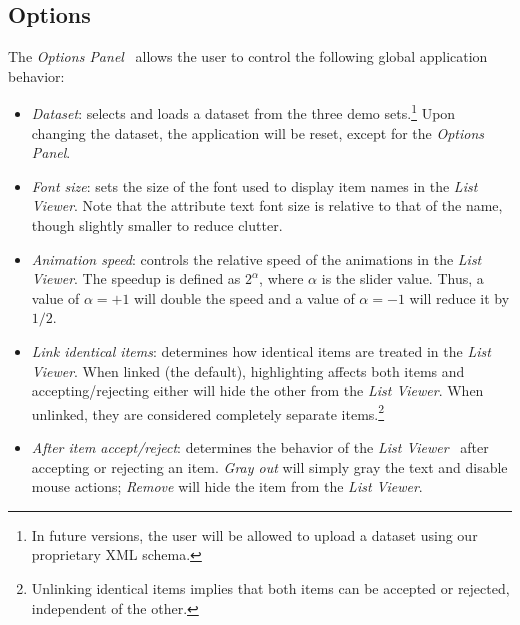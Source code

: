 \documentclass{chi2009}
\newcommand{\ListViewer}{\textit{List Viewer}}
\newcommand{\Options}{\textit{Options Panel}}
\begin{document}
\subsection{Options}
The \Options~ allows the user to control the following global application behavior:
\begin{itemize}
\item \textit{Dataset}: selects and loads a dataset from the three demo sets.\footnote{In future versions, the user will be allowed to upload a dataset using our proprietary XML schema.} Upon changing the dataset, the application will be reset, except for the \Options.
\item \textit{Font size}: sets the size of the font used to display item names in the \ListViewer. Note that the attribute text font size is relative to that of the name, though slightly smaller to reduce clutter.
\item \textit{Animation speed}: controls the relative speed of the animations in the \ListViewer. The speedup is defined as $2^\alpha$, where $\alpha$ is the slider value. Thus, a value of $\alpha = +1$ will double the speed and a value of $\alpha = -1$ will reduce it by $1/2$.
\item \textit{Link identical items}: determines how identical items are treated in the \ListViewer. When linked (the default), highlighting affects both items and accepting/rejecting either will hide the other from the \ListViewer. When unlinked, they are considered completely separate items.\footnote{Unlinking identical items implies that both items can be accepted or rejected, independent of the other.}
\item \textit{After item accept/reject}: determines the behavior of the \ListViewer~ after accepting or rejecting an item. \textit{Gray out} will simply gray the text and disable mouse actions; \textit{Remove} will hide the item from the \ListViewer.
\end{itemize}
\end{document}

